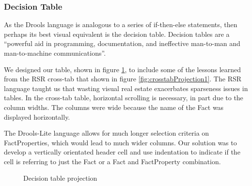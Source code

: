 \subsubsection{Decision Table}

As the Drools language is analogous to a series of if-then-else statements, then perhaps its best visual equivalent is the decision table.
Decision tables are a ``powerful aid in programming, documentation, and ineffective man-to-man and man-to-machine communications''\cite{pooch1974translation}.

We designed our table, shown in figure \ref{fig:decisionTableProjection}, to include some of the lessons learned from the RSR cross-tab that shown in figure \ref{fig:crosstabProjection1}.
The RSR language taught us that wasting visual real estate exacerbates sparseness issues in tables.
In the cross-tab table, horizontal scrolling is necessary, in part due to the column widths.
The columns were wide because the name of the Fact was displayed horizontally.

The Drools-Lite language allows for much longer selection criteria on FactProperties, which would lead to much wider columns.
Our solution was to develop a vertically orientated header cell and use indentation to indicate if the cell is referring to just the Fact or a Fact and FactProperty combination.

\begin{figure}[h]
    \centering
    \caption{Decision table projection}
    \label{fig:decisionTableProjection}
\end{figure}

